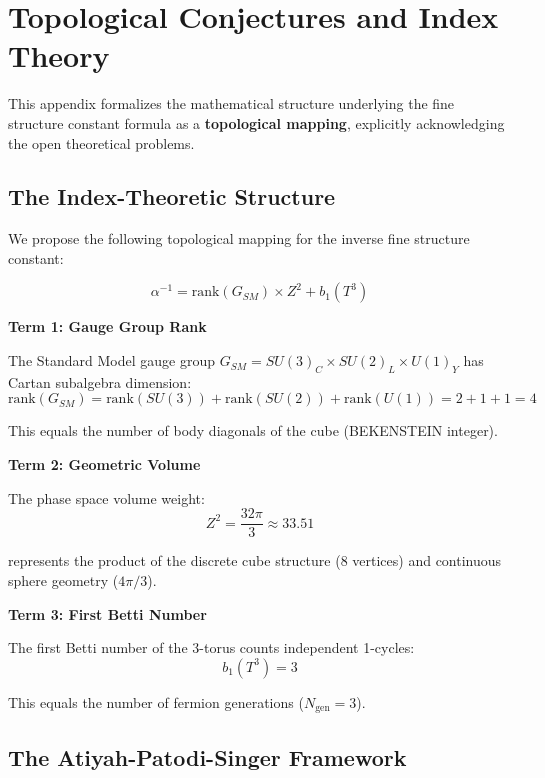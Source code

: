 \documentclass[12pt,a4paper]{article}
\newcommand{\Zsq}{Z^2}
\newcommand{\Ngen}{N_{\text{gen}}}
\begin{document}
\section{Topological Conjectures and Index Theory}
\label{app:conjectures}

This appendix formalizes the mathematical structure underlying the fine structure constant formula as a \textbf{topological mapping}, explicitly acknowledging the open theoretical problems.

\subsection{The Index-Theoretic Structure}

We propose the following topological mapping for the inverse fine structure constant:

\begin{equation}
\boxed{\alpha^{-1} = \text{rank}(G_{SM}) \times \Zsq + b_1(T^3)}
\end{equation}

\textbf{Term 1: Gauge Group Rank}

The Standard Model gauge group $G_{SM} = SU(3)_C \times SU(2)_L \times U(1)_Y$ has Cartan subalgebra dimension:
\begin{equation}
\text{rank}(G_{SM}) = \text{rank}(SU(3)) + \text{rank}(SU(2)) + \text{rank}(U(1)) = 2 + 1 + 1 = 4
\end{equation}

This equals the number of body diagonals of the cube (BEKENSTEIN integer).

\textbf{Term 2: Geometric Volume}

The phase space volume weight:
\begin{equation}
\Zsq = \frac{32\pi}{3} \approx 33.51
\end{equation}

represents the product of the discrete cube structure (8 vertices) and continuous sphere geometry ($4\pi/3$).

\textbf{Term 3: First Betti Number}

The first Betti number of the 3-torus counts independent 1-cycles:
\begin{equation}
b_1(T^3) = 3
\end{equation}

This equals the number of fermion generations ($\Ngen = 3$).

\subsection{The Atiyah-Patodi-Singer Framework}
\end{document}
